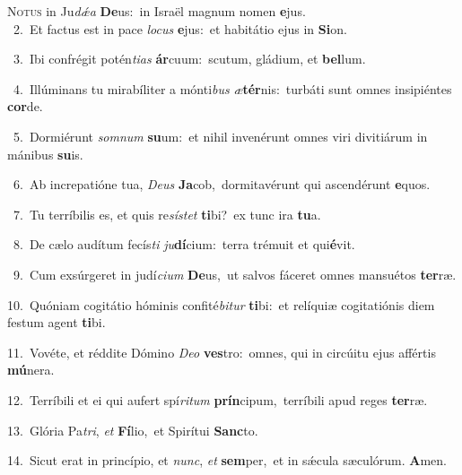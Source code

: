 \lettrine{\initial\textcolor{\initialcolor}{N}}{otus} in Ju\-\textit{dǽ}\-\textit{a} \textbf{De}\-us:~\star in Israël magnum nomen \textbf{e}\-jus.\\
{\numbfont\textcolor{\numbcolor}{~2.}}~Et factus est in pace \textit{lo}\-\textit{cus} \textbf{e}\-jus:~\star et habitátio ejus in \textbf{Si}\-on.\par
{\numbfont\textcolor{\numbcolor}{~3.}}~Ibi confrégit potén\-\textit{ti}\-\textit{as} \textbf{ár}\-cuum:~\star scutum, gládium, et \textbf{bel}\-lum.\par
{\numbfont\textcolor{\numbcolor}{~4.}}~Illúminans tu mirabíliter a mónti\textit{bus} \textit{æ}\-\textbf{tér}nis:~\star turbáti sunt omnes insipiéntes \textbf{cor}\-de.\par
{\numbfont\textcolor{\numbcolor}{~5.}}~Dormiérunt \textit{som}\-\textit{num} \textbf{su}\-um:~\star et nihil invenérunt omnes viri divitiárum in mánibus \textbf{su}\-is.\par
{\numbfont\textcolor{\numbcolor}{~6.}}~Ab increpatióne tua, \textit{De}\-\textit{us} \textbf{Ja}\-cob,~\star dormitavérunt qui ascendérunt \textbf{e}\-quos.\par
{\numbfont\textcolor{\numbcolor}{~7.}}~Tu terríbilis es, et quis re\-\textit{sís}\-\textit{tet} \textbf{ti}\-bi?~\star ex tunc ira \textbf{tu}\-a.\par
{\numbfont\textcolor{\numbcolor}{~8.}}~De cælo audítum fecís\textit{ti} \textit{ju}\-\textbf{dí}cium:~\star terra trémuit et qui\-\textbf{é}\-vit.\par
{\numbfont\textcolor{\numbcolor}{~9.}}~Cum exsúrgeret in judí\-\textit{ci}\-\textit{um} \textbf{De}\-us,~\star ut salvos fáceret omnes mansuétos \textbf{ter}\-ræ.\par
{\numbfont\textcolor{\numbcolor}{10.}}~Quóniam cogitátio hóminis confité\-\textit{bi}\-\textit{tur} \textbf{ti}\-bi:~\star et relíquiæ cogitatiónis diem festum agent \textbf{ti}\-bi.\par
{\numbfont\textcolor{\numbcolor}{11.}}~Vovéte, et réddite Dómino \textit{De}\-\textit{o} \textbf{ves}\-tro:~\star omnes, qui in circúitu ejus affértis \textbf{mú}\-nera.\par
{\numbfont\textcolor{\numbcolor}{12.}}~Terríbili et ei qui aufert spí\-\textit{ri}\-\textit{tum} \textbf{prín}\-cipum,~\star terríbili apud reges \textbf{ter}\-ræ.\par
{\numbfont\textcolor{\numbcolor}{13.}}~Glória Pa\-\textit{tri}\-, \textit{et} \textbf{Fí}\-lio,~\star et Spirítui \textbf{Sanc}\-to.\par
{\numbfont\textcolor{\numbcolor}{14.}}~Sicut erat in princípio, et \textit{nunc}\-, \textit{et} \textbf{sem}\-per,~\star et in sǽcula sæculórum. \textbf{A}\-men.\par
